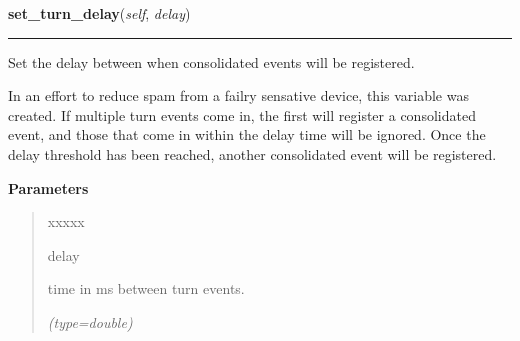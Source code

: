     \label{PowerMateEventHandler:PowerMateEventHandler:set_turn_delay}

    \vspace{0.5ex}

\hspace{.8\funcindent}\begin{boxedminipage}{\funcwidth}

    \raggedright \textbf{set\_turn\_delay}(\textit{self}, \textit{delay})

    \vspace{-1.5ex}

    \rule{\textwidth}{0.5\fboxrule}
\setlength{\parskip}{2ex}
    Set the delay between when consolidated events will be registered.

    In an effort to reduce spam from a failry sensative device, this 
    variable was created. If multiple turn events come in, the first will 
    register a consolidated event, and those that come in within the delay 
    time will be ignored. Once the delay threshold has been reached, 
    another consolidated event will be registered.

\setlength{\parskip}{1ex}
      \textbf{Parameters}
      \vspace{-1ex}

      \begin{quote}
        \begin{Ventry}{xxxxx}

          \item[delay]

          time in ms between turn events.

            {\it (type=double)}

        \end{Ventry}

      \end{quote}

    \end{boxedminipage}

    \label{PowerMateEventHandler:PowerMateEventHandler:set_read_delay}

    \vspace{0.5ex}

